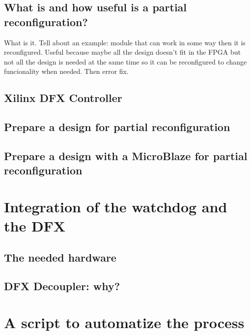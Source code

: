 \subsection{What is and how useful is a partial reconfiguration?}

What is it. Tell about an example: module that can work in some way then it is reconfigured. Useful because maybe all the design doesn't fit in the FPGA but not all the design is needed at the same time so it can be reconfigured to change funcionality when needed. %
Then error fix.

\subsection{Xilinx DFX Controller}
\subsection{Prepare a design for partial reconfiguration}
\subsection{Prepare a design with a MicroBlaze for partial reconfiguration}

\section{Integration of the watchdog and the DFX}
\subsection{The needed hardware}
\subsection{DFX Decoupler: why?}

\section{A script to automatize the process}